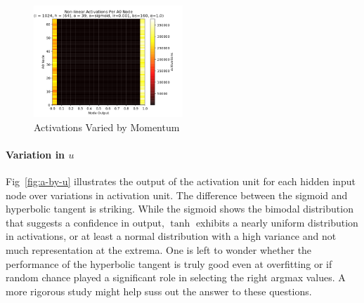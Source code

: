 \documentclass[10pt,epsf]{article}
\begin{document}
{{\begin{figure}[H]
      \includegraphics[width=0.5\textwidth]{./img/64-0.001-160-1-sigmoid-1/activations-A0-255.png}
      \caption{Activations Varied by Momentum}
      \label{fig:a-by-m}
    \end{figure}
    \paragraph{Variation in $u$}{
      Fig~\ref{fig:a-by-u} illustrates the output of the activation unit for each hidden input node
      over variations in activation unit. The difference between the sigmoid and hyperbolic tangent
      is striking. While the sigmoid shows the bimodal distribution that suggests a confidence
      in output, $\tanh$ exhibits a nearly uniform distribution in activations, or at least a
      normal distribution with a high variance and not much representation at the extrema. One is
      left to wonder whether the performance of the hyperbolic tangent is truly good even at overfitting
      or if random chance played a significant role in selecting the right argmax values. A more
      rigorous study might help suss out the answer to these questions.

}}}
\end{document}
